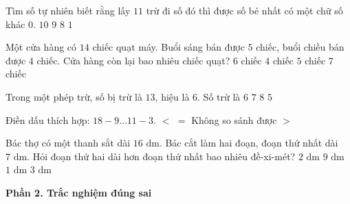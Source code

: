 \begin{ex} %
Tìm số tự nhiên biết rằng lấy $11$ trừ đi số đó thì được số bé nhất có một chữ số khác 0.
\choice
{\True $10$}
{$9$}
{$8$}
{$1$}
\end{ex}

\begin{ex} %
Một cửa hàng có $14$ chiếc quạt máy. Buổi sáng bán được $5$ chiếc, buổi chiều bán được $4$ chiếc. Cửa hàng còn lại bao nhiêu chiếc quạt?
\choice
{$6$ chiếc}
{$4$ chiếc}
{\True $5$ chiếc}
{$7$ chiếc}
\end{ex}

\begin{ex} %
Trong một phép trừ, số bị trừ là $13$, hiệu là $6$. Số trừ là
\choice
{$6$}
{\True $7$}
{$8$}
{$5$}
\end{ex}

\begin{ex} %
Điền dấu thích hợp: $18 - 9 \dots 11 - 3$.
\choice
{$<$}
{$=$}
{Không so sánh được}
{\True $>$}
\end{ex}

\begin{ex} %
Bác thợ có một thanh sắt dài $16\text{ dm}$. Bác cắt làm hai đoạn, đoạn thứ nhất dài $7\text{ dm}$. Hỏi đoạn thứ hai dài hơn đoạn thứ nhất bao nhiêu đề-xi-mét?
\choice
{\True $2\text{ dm}$}
{$9\text{ dm}$}
{$1\text{ dm}$}
{$3\text{ dm}$}
\end{ex}

\textbf{Phần 2. Trắc nghiệm đúng sai}

